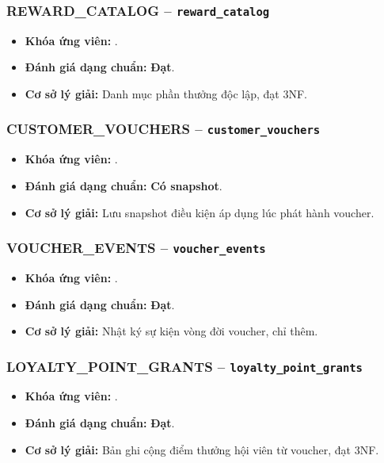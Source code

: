 \subsubsection{REWARD_CATALOG -- \texttt{reward\_catalog}}
\begin{itemize}
  \item \textbf{Khóa ứng viên:} \texttt{}.
  \item \textbf{Đánh giá dạng chuẩn:} \textbf{Đạt}.
  \item \textbf{Cơ sở lý giải:} Danh mục phần thưởng độc lập, đạt 3NF.
\end{itemize}

\subsubsection{CUSTOMER_VOUCHERS -- \texttt{customer\_vouchers}}
\begin{itemize}
  \item \textbf{Khóa ứng viên:} \texttt{}.
  \item \textbf{Đánh giá dạng chuẩn:} \textbf{Có snapshot}.
  \item \textbf{Cơ sở lý giải:} Lưu snapshot điều kiện áp dụng lúc phát hành voucher.
\end{itemize}

\subsubsection{VOUCHER_EVENTS -- \texttt{voucher\_events}}
\begin{itemize}
  \item \textbf{Khóa ứng viên:} \texttt{}.
  \item \textbf{Đánh giá dạng chuẩn:} \textbf{Đạt}.
  \item \textbf{Cơ sở lý giải:} Nhật ký sự kiện vòng đời voucher, chỉ thêm.
\end{itemize}

\subsubsection{LOYALTY_POINT_GRANTS -- \texttt{loyalty\_point\_grants}}
\begin{itemize}
  \item \textbf{Khóa ứng viên:} \texttt{}.
  \item \textbf{Đánh giá dạng chuẩn:} \textbf{Đạt}.
  \item \textbf{Cơ sở lý giải:} Bản ghi cộng điểm thưởng hội viên từ voucher, đạt 3NF.
\end{itemize}

